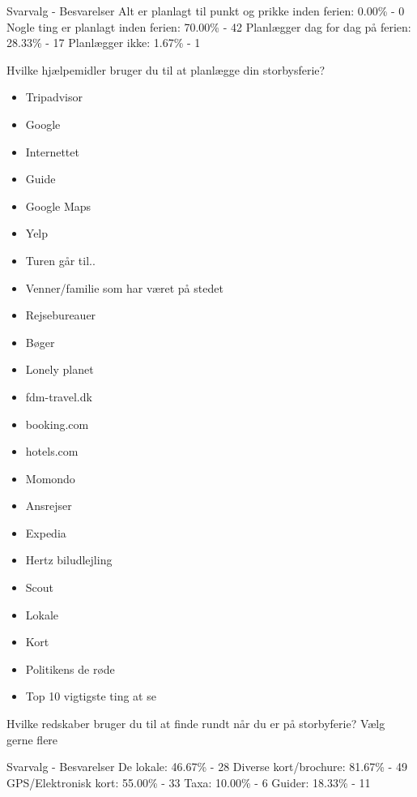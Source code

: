Svarvalg - Besvarelser \newline
Alt er planlagt til punkt og prikke inden ferien:
0.00\% - 0 \newline
Nogle ting er planlagt inden ferien:
70.00\% - 42 \newline
Planlægger dag for dag på ferien:
28.33\%  -  17 \newline
Planlægger ikke:
1.67\%  -  1

Hvilke hjælpemidler bruger du til at planlægge din storbysferie?

\begin{itemize}
	\item Tripadvisor
	\item Google
	\item Internettet
	\item Guide
	\item Google Maps
	\item Yelp
	\item Turen går til..
	\item Venner/familie som har været på stedet
	\item Rejsebureauer
	\item Bøger
	\item Lonely planet
	\item fdm-travel.dk
	\item booking.com
	\item hotels.com
	\item Momondo
	\item Ansrejser
	\item Expedia
	\item Hertz biludlejling
	\item Scout
	\item Lokale
	\item Kort
	\item Politikens de røde
	\item Top 10 vigtigste ting at se
\end{itemize}

Hvilke redskaber bruger du til at finde rundt når du er på storbyferie?
Vælg gerne flere

Svarvalg - Besvarelser\newline
De lokale:
46.67\%  -  28 \newline
Diverse kort/brochure:
81.67\%  -  49 \newline
GPS/Elektronisk kort:
55.00\%  -  33 \newline
Taxa:
10.00\%  -   6 \newline
Guider:
18.33\% - 11 \newline



